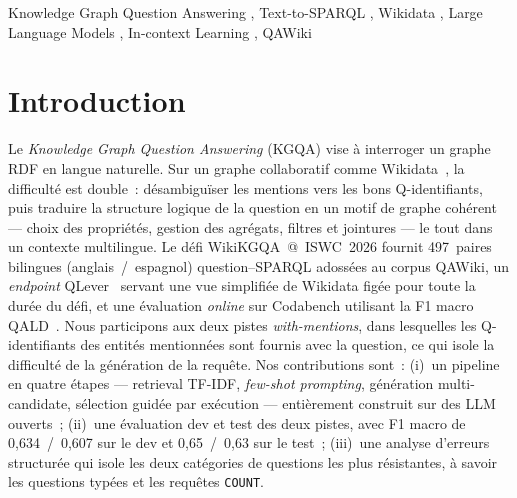 \documentclass[]{ceurart}
\begin{document}
\begin{keywords}
  Knowledge Graph Question Answering \sep
  Text-to-SPARQL \sep
  Wikidata \sep
  Large Language Models \sep
  In-context Learning \sep
  QAWiki
\end{keywords}

\maketitle

\section{Introduction}
\label{sec:intro}
Le \emph{Knowledge Graph Question Answering} (KGQA) vise à interroger un graphe RDF en langue naturelle. Sur un graphe collaboratif comme Wikidata~\cite{vrandecic2014wikidata}, la difficulté est double~: désambiguïser les mentions vers les bons Q-identifiants, puis traduire la structure logique de la question en un motif de graphe cohérent — choix des propriétés, gestion des agrégats, filtres et jointures — le tout dans un contexte multilingue. Le défi WikiKGQA~@~ISWC~2026 fournit \num{497}~paires bilingues (anglais~/~espagnol) question–SPARQL adossées au corpus QAWiki, un \emph{endpoint} QLever~\cite{bast2017qlever} servant une vue simplifiée de Wikidata figée pour toute la durée du défi, et une évaluation \emph{online} sur Codabench utilisant la F1 macro QALD~\cite{usbeck2017qald}. Nous participons aux deux pistes \emph{with-mentions}, dans lesquelles les Q-identifiants des entités mentionnées sont fournis avec la question, ce qui isole la difficulté de la génération de la requête. Nos contributions sont~: (i)~un pipeline en quatre étapes — retrieval TF-IDF, \emph{few-shot prompting}, génération multi-candidate, sélection guidée par exécution — entièrement construit sur des LLM ouverts~; (ii)~une évaluation dev et test des deux pistes, avec F1 macro de 0{,}634~/~0{,}607 sur le dev et 0{,}65~/~0{,}63 sur le test~; (iii)~une analyse d'erreurs structurée qui isole les deux catégories de questions les plus résistantes, à savoir les questions typées et les requêtes \texttt{COUNT}.

\end{document}
